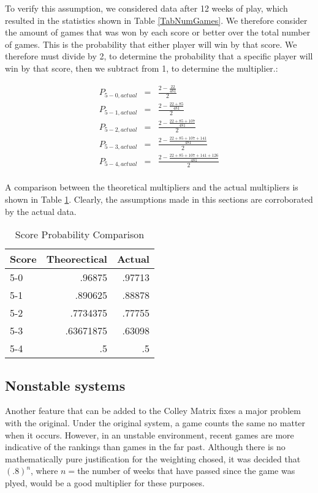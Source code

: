 \documentclass[12pt, letterpaper]{article}
\begin{document}
\par To verify this assumption, we considered data after 12 weeks of play, which resulted in the statistics shown in Table \ref{TabNumGames}.  We therefore consider the amount of games that was won by each score or better over the total number of games.  This is the probability that either player will win by that score.  We therefore must divide by 2, to determine the probability that a specific player will win by that score, then we subtract from 1, to determine the multiplier.:

\begin{eqnarray*}
P_{5-0,actual} & = & \frac{2-\frac{22}{481}}{2} \\
P_{5-1,actual} & = & \frac{2-\frac{22+85}{481}}{2} \\
P_{5-2,actual} & = & \frac{2-\frac{22+85+107}{481}}{2} \\
P_{5-3,actual} & = & \frac{2-\frac{22+85+107+141}{481}}{2} \\
P_{5-4,actual} & = & \frac{2-\frac{22+85+107+141+126}{481}}{2} \\
\end{eqnarray*}
\par A comparison between the theoretical multipliers and the actual multipliers is shown in Table \ref{TabProbComp}.  Clearly, the assumptions made in this sections are corroborated by the actual data.

\begin{table}
\centering
\begin{tabular}{|l|r|r|}
\hline
Score & Theorectical & Actual \\ \hline
5-0 & .96875 & .97713 \\
5-1 & .890625 & .88878 \\
5-2 & .7734375 & .77755 \\
5-3 & .63671875 & .63098 \\
5-4 & .5 & .5 \\
\hline
\end{tabular}
\caption{Score Probability Comparison}
\label{TabProbComp}
\end{table}

\subsection{Nonstable systems}

\par Another feature that can be added to the Colley Matrix fixes a major problem with the original.  Under the original system, a game counts the same no matter when it occurs.  However, in an unstable environment, recent games are more indicative of the rankings than games in the far past.  Although there is no mathematically pure justification for the weighting chosed, it was decided that $(.8)^n$, where $n=$the number of weeks that have passed since the game was plyed, would be a good multiplier for these purposes.
\end{document}
